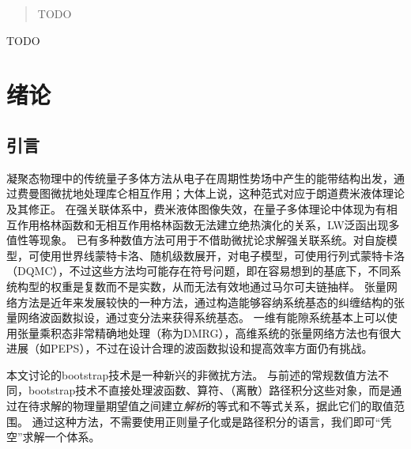 \documentclass[oneside]{fduthesis}
\begin{document}
\renewcommand{\Re}{\mathrm{Re}}
\renewcommand{\Im}{\mathrm{Im}}
\newcommand{\pair}[1]{\langle #1 \rangle}

\frontmatter

\tableofcontents

\begin{abstract}
TODO
\end{abstract}

\begin{abstract*}
TODO
\end{abstract*}

\mainmatter


%   
%   
%   

\chapter{绪论}

\section{引言}

凝聚态物理中的传统量子多体方法从电子在周期性势场中产生的能带结构出发，通过费曼图微扰地处理库仑相互作用；大体上说，这种范式对应于朗道费米液体理论及其修正\cite{mahan2013many}。
在强关联体系中，费米液体图像失效，在量子多体理论中体现为有相互作用格林函数和无相互作用格林函数无法建立绝热演化的关系，LW泛函出现多值性等现象\cite{Gunnarsson_2017}。
已有多种数值方法可用于不借助微扰论求解强关联系统。对自旋模型，可使用世界线蒙特卡洛、随机级数展开，对电子模型，可使用行列式蒙特卡洛（DQMC），不过这些方法均可能存在符号问题，即在容易想到的基底下，不同系统构型的权重是复数而不是实数，从而无法有效地通过马尔可夫链抽样\cite{sign_problem}。
张量网络方法是近年来发展较快的一种方法，通过构造能够容纳系统基态的纠缠结构的张量网络波函数拟设，通过变分法来获得系统基态。
一维有能隙系统基本上可以使用张量乘积态非常精确地处理（称为DMRG），高维系统的张量网络方法也有很大进展（如PEPS），不过在设计合理的波函数拟设和提高效率方面仍有挑战\cite{orus2019tensor}。

本文讨论的bootstrap技术是一种新兴的非微扰方法\cite{han_matrix,bhattacharya2021,kazakov2021analytic,han_manybody}。
与前述的常规数值方法不同，bootstrap技术不直接处理波函数、算符、（离散）路径积分这些对象，而是通过在待求解的物理量期望值之间建立\emph{解析}的等式和不等式关系，据此它们的取值范围。
通过这种方法，不需要使用正则量子化或是路径积分的语言，我们即可“凭空”求解一个体系。
\end{document}
